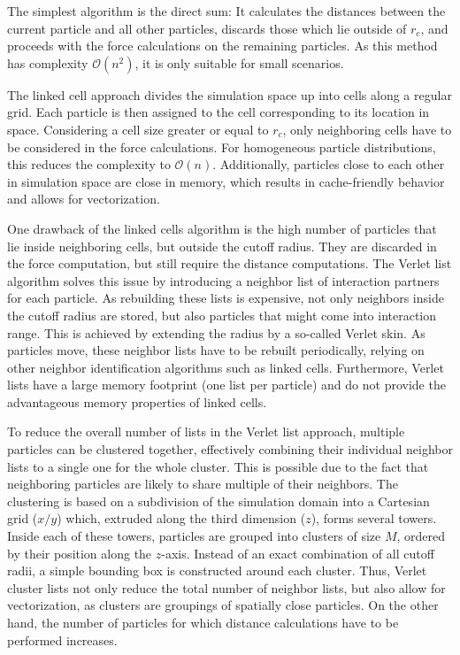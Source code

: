 \begin{description}[leftmargin=!,labelwidth=\widthof{\textbf{Verlet Cluster Lists}}]
	\item[\textbf{Direct Sum}] The simplest algorithm is the direct sum: It calculates the distances between the current particle and all other particles, discards those which lie outside of $r_c$, and proceeds with the force calculations on the remaining particles. As this method has complexity $\mathcal{O}\left(n^2\right)$, it is only suitable for small scenarios.
	\item[\textbf{Linked Cells}] The linked cell approach divides the simulation space up into cells along a regular grid. Each particle is then assigned to the cell corresponding to its location in space. Considering a cell size greater or equal to $r_c$, only neighboring cells have to be considered in the force calculations. For homogeneous particle distributions, this reduces the complexity to $\mathcal{O}\left(n\right)$. Additionally, particles close to each other in simulation space are close in memory, which results in cache-friendly behavior and allows for vectorization.
	\item[\textbf{Verlet Lists}] One drawback of the linked cells algorithm is the high number of particles that lie inside neighboring cells, but outside the cutoff radius. They are discarded in the force computation, but still require the distance computations. The Verlet list algorithm solves this issue by introducing a neighbor list of interaction partners for each particle. As rebuilding these lists is expensive, not only neighbors inside the cutoff radius are stored, but also particles that might come into interaction range. This is achieved by extending the radius by a so-called Verlet skin. As particles move, these neighbor lists have to be rebuilt periodically, relying on other neighbor identification algorithms such as linked cells. Furthermore, Verlet lists have a large memory footprint (one list per particle) and do not provide the advantageous memory properties of linked cells.
	\item[\textbf{Verlet Cluster Lists}] To reduce the overall number of lists in the Verlet list approach, multiple particles can be clustered together, effectively combining their individual neighbor lists to a single one for the whole cluster. This is possible due to the fact that neighboring particles are likely to share multiple of their neighbors. The clustering is based on a subdivision of the simulation domain into a Cartesian grid ($x/y$) which, extruded along the third dimension ($z$), forms several towers. Inside each of these towers, particles are grouped into clusters of size $M$, ordered by their position along the $z$-axis. Instead of an exact combination of all cutoff radii, a simple bounding box is constructed around each cluster. Thus, Verlet cluster lists not only reduce the total number of neighbor lists, but also allow for vectorization, as clusters are groupings of spatially close particles. On the other hand, the number of particles for which distance calculations have to be performed increases.
\end{description}

